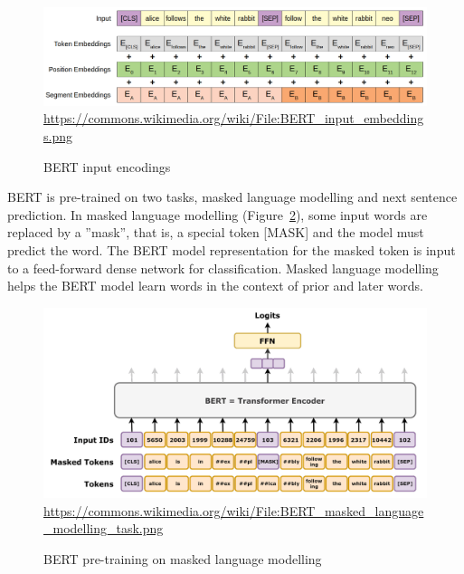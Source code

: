 \begin{figure}
\begin{center}
\includegraphics[width=\textwidth]{BERT_input_embeddings.png} \\

\scriptsize \url{https://commons.wikimedia.org/wiki/File:BERT_input_embeddings.png} \normalsize
\end{center}
\caption{BERT input encodings}
\label{fig:bertinput}
\end{figure}

BERT is pre-trained on two tasks, masked language modelling  and next sentence prediction. In masked language modelling (Figure~\ref{fig:bert_masked_language_modeling}), some input words are replaced by a ''mask'', that is, a special token [MASK] and the model must predict the word. The BERT model representation for the masked token is input to a feed-forward dense network for classification. Masked language modelling helps the BERT model learn words in the context of prior and later words. 

\begin{figure}
\begin{center}
\includegraphics[width=.8\textwidth]{BERT_masked_language_modelling_task.png} \\
\tiny \url{https://commons.wikimedia.org/wiki/File:BERT_masked_language_modelling_task.png} \normalsize \\

\end{center}
\caption{BERT pre-training on masked language modelling}
\label{fig:bert_masked_language_modeling}
\end{figure}

